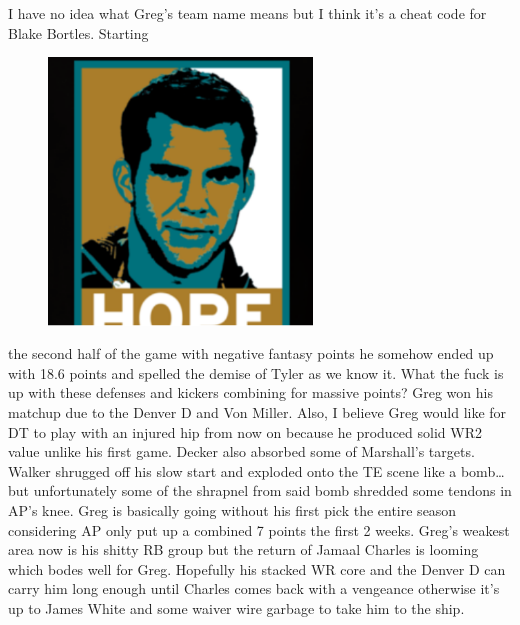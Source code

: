 \documentclass[11pt,letterpaper]{article}
\begin{document}
\newpage
{}
I have no idea what Greg's team name means but I think it's a cheat code for Blake Bortles. Starting  
\begin{figure}
\centering
\includegraphics[width=0.625\textwidth]{week2-bortles.png}
\label{fig:week2-bortles}
\end{figure} 
\par\noindent the second half of the game with negative fantasy points he somehow ended up with 18.6 points and spelled the demise of Tyler as we know it. What the fuck is up with these defenses and kickers combining for massive points? Greg won his matchup due to the Denver D and Von Miller. Also, I believe Greg would like for DT to play with an injured hip from now on because he produced solid WR2 value unlike his first game. Decker also absorbed some of Marshall's targets. Walker shrugged off his slow start and exploded onto the TE scene like a bomb\dots but unfortunately some of the shrapnel from said bomb shredded some tendons in AP's knee. Greg is basically going without his first pick the entire season considering AP only put up a combined 7 points the first 2 weeks. Greg's weakest area now is his shitty RB group but the return of Jamaal Charles is looming which bodes well for Greg. Hopefully his stacked WR core and the Denver D can carry him long enough until Charles comes back with a vengeance otherwise it's up to James White and some waiver wire garbage to take him to the ship.
\bigskip
\end{document}

